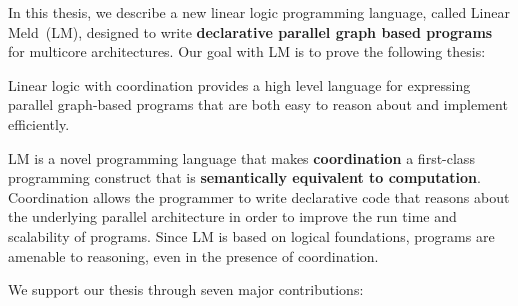 
In this thesis, we describe a new linear logic programming language, called
Linear Meld~(LM), designed to write \textbf{declarative parallel graph based
programs} for multicore architectures. Our goal with LM is to prove the
following thesis:

\begin{displayquote}
Linear logic with coordination provides a high level language for expressing
parallel graph-based programs that are both easy to reason about and implement
efficiently.
\end{displayquote}

LM is a novel programming language that makes \textbf{coordination} a
first-class programming construct that is \textbf{semantically equivalent to
computation}. Coordination allows the programmer to write declarative code that
reasons about the underlying parallel architecture in order to improve the run
time and scalability of programs. Since LM is based on logical foundations,
programs are amenable to reasoning, even in the presence of coordination.

We support our thesis through seven major contributions:

